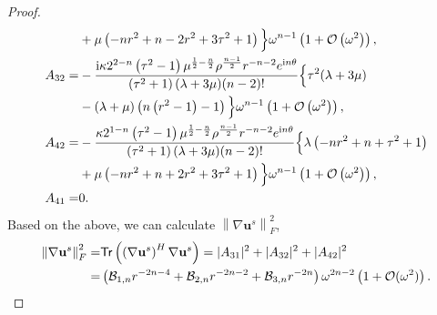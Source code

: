 \documentclass[11pt,reqno,twoside]{amsart}
\theoremstyle{definition}
\theoremstyle{remark}
\numberwithin{equation}{section}
\newcommand{\bu}{\mathbf{u}}
\begin{document}
\begin{proof}
\begin{align}
					&+\mu  \left(-n r^2+n-2 r^2+3 \tau ^2+1\right)\Big\}\omega^{n-1}\left(1+\mathcal{O}\left(\omega^2\right)\right),\notag\\
					A_{32}=&-\frac{\mathrm{i} \kappa 2^{2-n} \left(\tau ^2-1\right) \mu ^{\frac{1}{2}-\frac{n}{2}} \rho ^{\frac{n-1}{2}} r^{-n-2} e^{\mathrm{i} n\theta  } }{\left(\tau ^2+1\right) (\lambda +3 \mu )  (n-2)!}\Big\{\tau ^2 (\lambda +3 \mu )\notag\\
					&-(\lambda +\mu ) \left(n \left(r^2-1\right)-1\right)\Big\}\omega^{n-1}\left(1+\mathcal{O}\left(\omega^2\right)\right),\notag\\
					A_{42}=&-\frac{\kappa 2^{1-n} \left(\tau ^2-1\right) \mu ^{\frac{1}{2}-\frac{n}{2}} \rho ^{\frac{n-1}{2}} r^{-n-2} e^{\mathrm{i}n \theta  } }{\left(\tau ^2+1\right) (\lambda +3 \mu )  (n-2)!}\Big\{\lambda  \left(-n r^2+n+\tau ^2+1\right)\notag\\
					&+\mu  \left(-n r^2+n+2 r^2+3 \tau ^2+1\right)\Big\}\omega^{n-1}\left(1+\mathcal{O}\left(\omega^2\right)\right),\notag\\
					A_{41}=&0.\notag
				\end{align}
				\iffalse
				Based on the above, we can calculate $\left \| \nabla \bu^s \right \| _{F}^{2}$,
				\begin{align}\label{eq:graufxs}
					\left \| \nabla \bu^{s} \right \| _{F}^{2} =&{\sf Tr}\left(\left(\nabla \bu^{s}\right)^{H}\nabla \bu^{s} \right)=|A_{31}|^{2} +|A_{32}|^{2} +|A_{42}|^{2}  \\
					=&\left(\mathcal{B}_{1,n}r^{-2 n-4}+\mathcal{B}_{2,n}r^{-2 n-2}+ \mathcal{B}_{3,n}r^{-2 n}\right)\omega ^{2n-2}\left(1+\mathcal{O}(\omega^2  )\right).\notag
				\end{align}

\end{proof}
\end{document}
